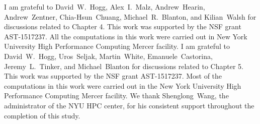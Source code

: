 I am grateful to David~W.~Hogg, Alex~I.~Malz, Andrew~Hearin, Andrew~Zentner, Chia-Hsun~Chuang, Michael~R.~Blanton, and Kilian~Walsh for discussions related to Chapter 4. This work was supported by the NSF grant AST-1517237. All the computations in this work were carried out in New York University High Performance Computing Mercer facility. 
I am grateful to David~W.~Hogg, Uros~Seljak, Martin~White, Emanuele~Castorina, Jeremy~L.~Tinker, and Michael~Blanton for discussions related to Chapter 5.
This work was supported by the NSF grant AST-1517237. Most of the computations in this work were carried out in the New York University High Performance Computing Mercer facility. We thank Shenglong~Wang, the administrator of the NYU HPC center, for his consistent support throughout the completion of this study.
 

